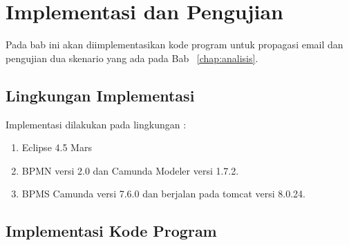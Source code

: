 \chapter{Implementasi dan Pengujian}
\label{chap:implementasipengujian}
Pada bab ini akan diimplementasikan kode program untuk propagasi email dan pengujian dua skenario yang ada pada Bab ~\ref{chap:analisis}.

\section{Lingkungan Implementasi}
\label{sec:lingkunganimplementasi}
Implementasi dilakukan pada lingkungan :
\begin{enumerate}
	\item Eclipse 4.5 Mars
	\item BPMN versi 2.0 dan Camunda Modeler versi 1.7.2.
	\item BPMS Camunda versi 7.6.0 dan berjalan pada tomcat versi 8.0.24.
	
\end{enumerate}
\section{Implementasi Kode Program}
\label{sec:kodeprogram}


